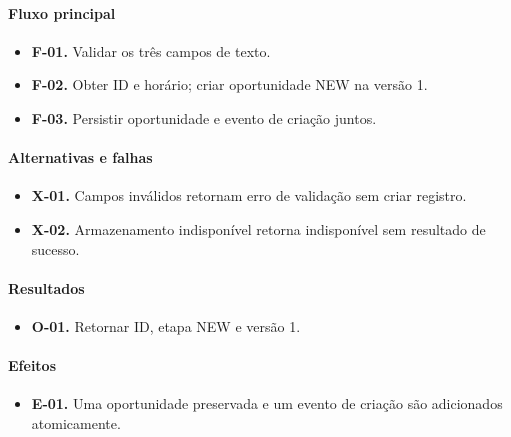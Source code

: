 \documentclass[10pt,a4paper]{article}
\begin{document}
\paragraph{Fluxo principal}

\begin{itemize}

\item \textbf{F-01.} Validar os três campos de texto.

\item \textbf{F-02.} Obter ID e horário; criar oportunidade NEW na versão 1.

\item \textbf{F-03.} Persistir oportunidade e evento de criação juntos.

\end{itemize}

\paragraph{Alternativas e falhas}

\begin{itemize}

\item \textbf{X-01.} Campos inválidos retornam erro de validação sem criar registro.

\item \textbf{X-02.} Armazenamento indisponível retorna indisponível sem resultado de sucesso.

\end{itemize}

\paragraph{Resultados}

\begin{itemize}

\item \textbf{O-01.} Retornar ID, etapa NEW e versão 1.

\end{itemize}

\paragraph{Efeitos}

\begin{itemize}

\item \textbf{E-01.} Uma oportunidade preservada e um evento de criação são adicionados atomicamente.

\end{itemize}
\end{document}
